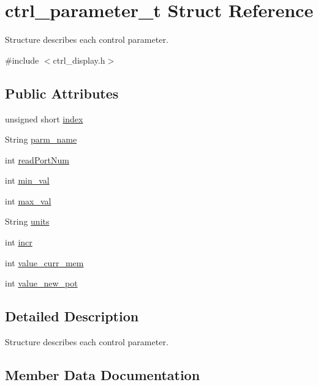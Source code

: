 \hypertarget{structctrl__parameter__t}{}\section{ctrl\+\_\+parameter\+\_\+t Struct Reference}
\label{structctrl__parameter__t}


Structure describes each control parameter.  




{\ttfamily \#include $<$ctrl\+\_\+display.\+h$>$}

\subsection*{Public Attributes}
\begin{DoxyCompactItemize}
\item 
unsigned short \hyperlink{structctrl__parameter__t_a7e917570c0ce853f517de82df398872d}{index}
\item 
String \hyperlink{structctrl__parameter__t_abf436e3e7d0aaff9ddeb0d28142bb7bb}{parm\+\_\+name}
\item 
int \hyperlink{structctrl__parameter__t_a55d700a3a519930eaabfd70bc415f4c7}{read\+Port\+Num}
\item 
int \hyperlink{structctrl__parameter__t_a5bea3ab520dfdf3c27f3f2baa81a4c36}{min\+\_\+val}
\item 
int \hyperlink{structctrl__parameter__t_ae727cbfc1947a7b682ee612fac91f2a3}{max\+\_\+val}
\item 
String \hyperlink{structctrl__parameter__t_a7a93a351592474570841e1b2d62e1cf6}{units}
\item 
int \hyperlink{structctrl__parameter__t_a7b4cc9774f3fb3fd21628f7a49d02bb0}{incr}
\item 
int \hyperlink{structctrl__parameter__t_a27972935b10fcdcad8fa3cd014c56ad0}{value\+\_\+curr\+\_\+mem}
\item 
int \hyperlink{structctrl__parameter__t_aa8dfbbc9a426a42a61ba6a6c0b5e5128}{value\+\_\+new\+\_\+pot}
\end{DoxyCompactItemize}


\subsection{Detailed Description}
Structure describes each control parameter. 

\subsection{Member Data Documentation}
\mbox{\label{structctrl__parameter__t_a7b4cc9774f3fb3fd21628f7a49d02bb0}} 
